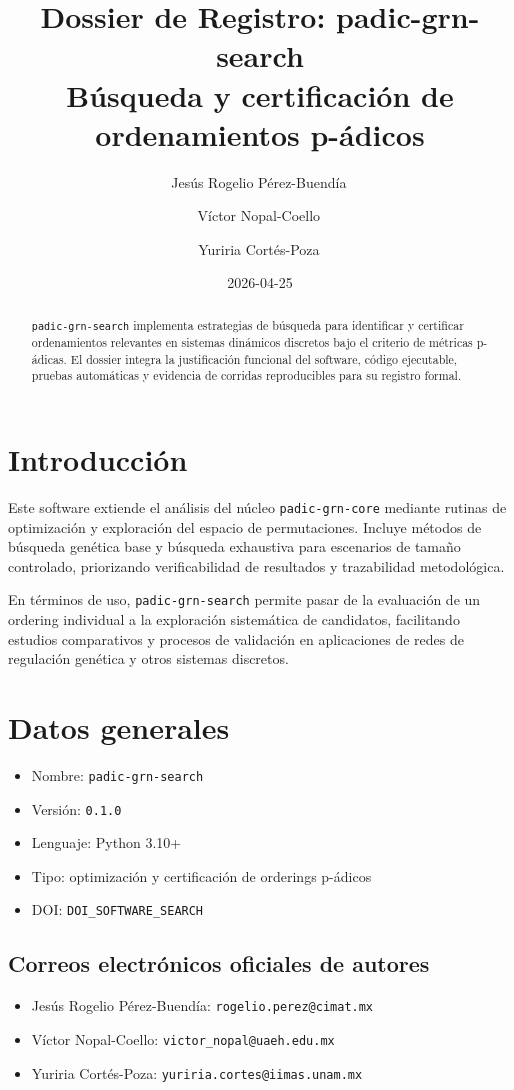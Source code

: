 \documentclass[11pt]{article}
\title{Dossier de Registro: padic-grn-search\\\large Búsqueda y certificación de ordenamientos p-ádicos}
\author{
Jesús Rogelio Pérez-Buendía\,\orcidlink{0000-0002-7739-4779}
\and
Víctor Nopal-Coello\,\orcidlink{0000-0003-2608-3636}
\and
Yuriria Cortés-Poza\,\orcidlink{0000-0003-1856-9206}
}
\date{2026-04-25}
\begin{document}
\maketitle
\begin{abstract}
\texttt{padic-grn-search} implementa estrategias de búsqueda para identificar y certificar ordenamientos relevantes en sistemas dinámicos discretos bajo el criterio de métricas p-ádicas. El dossier integra la justificación funcional del software, código ejecutable, pruebas automáticas y evidencia de corridas reproducibles para su registro formal.
\end{abstract}
\tableofcontents
\newpage

\section{Introducción}
Este software extiende el análisis del núcleo \texttt{padic-grn-core} mediante rutinas de optimización y exploración del espacio de permutaciones. Incluye métodos de búsqueda genética base y búsqueda exhaustiva para escenarios de tamaño controlado, priorizando verificabilidad de resultados y trazabilidad metodológica.

En términos de uso, \texttt{padic-grn-search} permite pasar de la evaluación de un ordering individual a la exploración sistemática de candidatos, facilitando estudios comparativos y procesos de validación en aplicaciones de redes de regulación genética y otros sistemas discretos.

\section{Datos generales}
\begin{itemize}
  \item Nombre: \texttt{padic-grn-search}
  \item Versión: \texttt{0.1.0}
  \item Lenguaje: Python 3.10+
  \item Tipo: optimización y certificación de orderings p-ádicos
  \item DOI: \texttt{DOI\_SOFTWARE\_SEARCH}
\end{itemize}

\subsection{Correos electrónicos oficiales de autores}
\begin{itemize}
  \item Jesús Rogelio Pérez-Buendía: \texttt{rogelio.perez@cimat.mx}
  \item Víctor Nopal-Coello: \texttt{victor\_nopal@uaeh.edu.mx}
  \item Yuriria Cortés-Poza: \texttt{yuriria.cortes@iimas.unam.mx}
\end{itemize}
\end{document}
